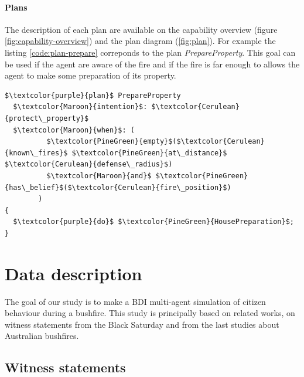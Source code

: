 \documentclass[12pt, a4paper]{memoir} %
\begin{document}
				\subsubsection{Plans}

					The description of each plan are available on the capability overview (figure \ref{fig:capability-overview}) and the plan diagram (\ref{fig:plan}).
					For example the listing \ref{code:plan-prepare} correponds to the plan \textit{PrepareProperty}. This goal can be used if the agent are aware of the fire and
					if the fire is far enough to allows the agent to make some preparation of its property.

					\begin{lstlisting}[mathescape,caption=Plan PrepareProperty.,label=code:plan-prepare]
$\textcolor{purple}{plan}$ PrepareProperty
  $\textcolor{Maroon}{intention}$: $\textcolor{Cerulean}{protect\_property}$
  $\textcolor{Maroon}{when}$: (
          $\textcolor{PineGreen}{empty}$($\textcolor{Cerulean}{known\_fires}$ $\textcolor{PineGreen}{at\_distance}$ $\textcolor{Cerulean}{defense\_radius}$)
          $\textcolor{Maroon}{and}$ $\textcolor{PineGreen}{has\_belief}$($\textcolor{Cerulean}{fire\_position}$)
        )
{
  $\textcolor{purple}{do}$ $\textcolor{PineGreen}{HousePreparation}$;
}
					\end{lstlisting}

\chapter{Data description \label{chapter:data}}

	The goal of our study is to make a BDI multi-agent simulation of citizen behaviour during a bushfire.
  This study is principally based on related works, on witness statements from the Black Saturday\cite{witness} and from the last studies about Australian bushfires\cite{rhodes2014, adam2015}.
	\section{Witness statements}
\end{document}
